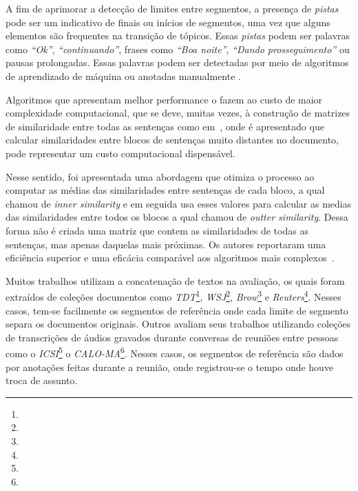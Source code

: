 %

A fim de aprimorar a detecção de limites entre segmentos, a presença de \textit{pistas} pode ser um indicativo de finais ou inícios de segmentos, uma vez que alguns elementos são frequentes na transição de tópicos. Essas \textit{pistas} podem ser palavras como \textit{``Ok''}, \textit{``continuando''}, frases como \textit{``Boa noite''}, \textit{``Dando prosseguimento''} ou pausas prolongadas. Essas palavras podem ser detectadas por meio de algoritmos de aprendizado de máquina ou anotadas manualmente
\cite{Hsueh2006} %
\cite{Galley2003} 
\cite{Beeferman1999}
.


Algoritmos que apresentam melhor performance o fazem ao custo de maior complexidade computacional, que se deve, muitas vezes, à construção de matrizes de similaridade entre todas as sentenças como em~\cite{Choi2000}, onde é apresentado que calcular similaridades entre blocos de sentenças muito distantes no documento, pode representar um custo computacional dispensável. %

Nesse sentido, foi apresentada uma abordagem que otimiza o processo ao computar as médias das similaridades entre sentenças de cada bloco, a qual chamou de \textit{inner similarity} e em seguida usa esses valores para calcular as medias das similaridades entre todos os blocos a qual chamou de \textit{outter similarity}. Dessa forma não é criada uma matriz que contem as similaridades de todas as sentenças, mas apenas daquelas mais próximas. Os autores reportaram uma eficiência superior e uma eficácia comparável aos algoritmos mais complexos~\cite{Kern2009}.


% 




Muitos trabalhos utilizam a concatenação de textos na avaliação, os quais foram extraídos de coleções documentos como 
\textit{TDT}\footnote{\urltdt},
\textit{WSJ}\footnote{\urlwsj},
\textit{Brow}\footnote{\urlbrowcorpus} e 
\textit{Reuters}\footnote{\urlreuterscorpus}. Nesses casos, tem-se facilmente os segmentos de referência onde cada limite de segmento separa os documentos originais.
%
%
Outros avaliam seus trabalhos utilizando coleções de transcrições de áudios gravados durante conversas de reuniões entre pessoas como o \textit{ICSI}\footnote{\urlicsi} o \textit{CALO-MA}\footnote{\urlcaloproject}. Nesses casos, os segmentos de referência são dados por anotações feitas durante a reunião, onde registrou-se o tempo onde houve troca de assunto\cite{Tur2010}.


